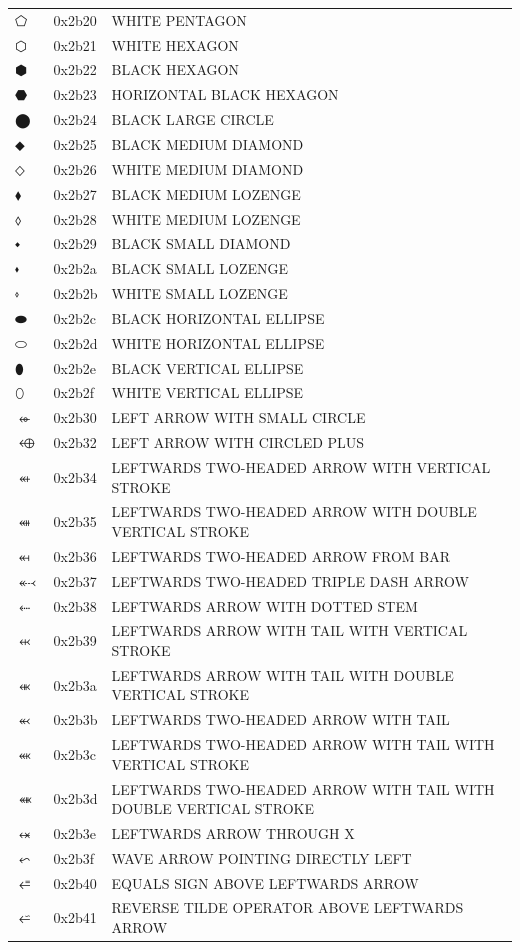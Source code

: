 \documentclass[12pt, twoside]{article}
\begin{document}
\begin{longtable}{L{1.0cm} L{2.0cm} >{\footnotesize}L{10cm}}
$⬠$&0x2b20&WHITE PENTAGON\\
$⬡$&0x2b21&WHITE HEXAGON\\
$⬢$&0x2b22&BLACK HEXAGON\\
$⬣$&0x2b23&HORIZONTAL BLACK HEXAGON\\
$⬤$&0x2b24&BLACK LARGE CIRCLE\\
$⬥$&0x2b25&BLACK MEDIUM DIAMOND\\
$⬦$&0x2b26&WHITE MEDIUM DIAMOND\\
$⬧$&0x2b27&BLACK MEDIUM LOZENGE\\
$⬨$&0x2b28&WHITE MEDIUM LOZENGE\\
$⬩$&0x2b29&BLACK SMALL DIAMOND\\
$⬪$&0x2b2a&BLACK SMALL LOZENGE\\
$⬫$&0x2b2b&WHITE SMALL LOZENGE\\
$⬬$&0x2b2c&BLACK HORIZONTAL ELLIPSE\\
$⬭$&0x2b2d&WHITE HORIZONTAL ELLIPSE\\
$⬮$&0x2b2e&BLACK VERTICAL ELLIPSE\\
$⬯$&0x2b2f&WHITE VERTICAL ELLIPSE\\
$⬰$&0x2b30&LEFT ARROW WITH SMALL CIRCLE\\
$⬲$&0x2b32&LEFT ARROW WITH CIRCLED PLUS\\
$⬴$&0x2b34&LEFTWARDS TWO-HEADED ARROW WITH VERTICAL STROKE\\
$⬵$&0x2b35&LEFTWARDS TWO-HEADED ARROW WITH DOUBLE VERTICAL STROKE\\
$⬶$&0x2b36&LEFTWARDS TWO-HEADED ARROW FROM BAR\\
$⬷$&0x2b37&LEFTWARDS TWO-HEADED TRIPLE DASH ARROW\\
$⬸$&0x2b38&LEFTWARDS ARROW WITH DOTTED STEM\\
$⬹$&0x2b39&LEFTWARDS ARROW WITH TAIL WITH VERTICAL STROKE\\
$⬺$&0x2b3a&LEFTWARDS ARROW WITH TAIL WITH DOUBLE VERTICAL STROKE\\
$⬻$&0x2b3b&LEFTWARDS TWO-HEADED ARROW WITH TAIL\\
$⬼$&0x2b3c&LEFTWARDS TWO-HEADED ARROW WITH TAIL WITH VERTICAL STROKE\\
$⬽$&0x2b3d&LEFTWARDS TWO-HEADED ARROW WITH TAIL WITH DOUBLE VERTICAL STROKE\\
$⬾$&0x2b3e&LEFTWARDS ARROW THROUGH X\\
$⬿$&0x2b3f&WAVE ARROW POINTING DIRECTLY LEFT\\
$⭀$&0x2b40&EQUALS SIGN ABOVE LEFTWARDS ARROW\\
$⭁$&0x2b41&REVERSE TILDE OPERATOR ABOVE LEFTWARDS ARROW\\

\end{longtable}
\end{document}
